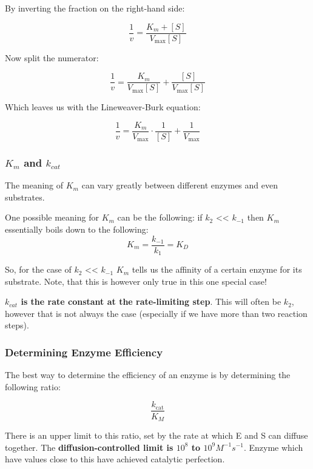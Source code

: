 \documentclass[../main.tex]{subfiles}
\begin{document}
By inverting the fraction on the right-hand side:

\begin{equation}
	\frac{1}{v} = \frac{K_m + [S]}{V_{\max}[S]}
\end{equation}

Now split the numerator:

\begin{equation}
	\frac{1}{v} = \frac{K_m}{V_{\max}[S]} + \frac{[S]}{V_{\max}[S]}
\end{equation}

Which leaves us with the Lineweaver-Burk equation:

\begin{equation}
	\frac{1}{v} = \frac{K_m}{V_{\max}} \cdot \frac{1}{[S]} + \frac{1}{V_{\max}}
\end{equation}


\subsubsection{$K_{m}$ and $k_{cat}$}

The meaning of $K_{m}$ can vary greatly between different enzymes and even substrates.

One possible meaning for $K_{m}$ can be the following: if $k_{2}$ << $k_{-1}$ then $K_{m}$ essentially boils down to the following:
\begin{equation}
	K_{m} = \dfrac{k_{-1}}{k_{1}} = K_{D}
\end{equation}

So, for the case of $k_{2}$ << $k_{-1}$ $K_{m}$ tells us the affinity of a certain enzyme for its substrate. Note, that this is however only true in this one special case!

\textbf{$k_{cat}$ is the rate constant at the rate-limiting step}. This will often be $k_{2}$, however that is not always the case (especially if we have more than two reaction steps).

\subsubsection{Determining \gls{Enzyme Efficiency}}

The best way to determine the efficiency of an enzyme is by determining the following ratio:

\begin{equation}
	\frac{k_{\text{cat}}}{K_M}
\end{equation}

There is an upper limit to this ratio, set by the rate at which E and S can diffuse together. The \textbf{diffusion-controlled limit is $10^{8}$ to $10^{9} M^{-1}s^{-1}$}. Enzyme which have values close to this have achieved catalytic perfection.
\end{document}
